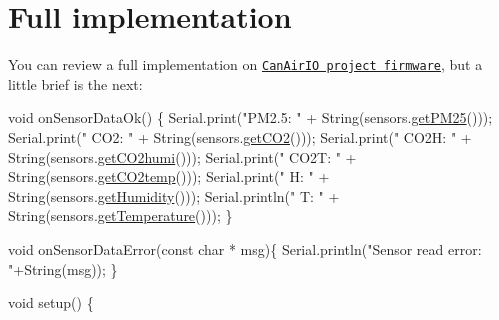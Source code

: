 \section*{Full implementation}

You can review a full implementation on \href{https://github.com/kike-canaries/canairio_firmware/blob/master/src/main.cpp}{\tt Can\+Air\+IO project firmware}, but a little brief is the next\+:


\begin{DoxyCode}
\textcolor{keywordtype}{void} onSensorDataOk() \{
    Serial.print(\textcolor{stringliteral}{"PM2.5: "} + String(sensors.\hyperlink{classSensors_adc3ad26b8a9be10b2100e3b023fdefc4}{getPM25}()));
    Serial.print(\textcolor{stringliteral}{" CO2: "}  + String(sensors.\hyperlink{classSensors_ad953d4564cc20d8134cccd962435dd81}{getCO2}()));
    Serial.print(\textcolor{stringliteral}{" CO2H: "} + String(sensors.\hyperlink{classSensors_a7fa1fe8f4f3469bce9311be880c243df}{getCO2humi}()));
    Serial.print(\textcolor{stringliteral}{" CO2T: "} + String(sensors.\hyperlink{classSensors_a7afb5c201c4e1933c96719e632181f71}{getCO2temp}()));
    Serial.print(\textcolor{stringliteral}{" H: "}    + String(sensors.\hyperlink{classSensors_a255bf73cd4afaf6c656dbbcabb1a8bb1}{getHumidity}()));
    Serial.println(\textcolor{stringliteral}{" T: "}  + String(sensors.\hyperlink{classSensors_ac4c22766994b94a2a28158ed72dc4a0c}{getTemperature}()));
\}

\textcolor{keywordtype}{void} onSensorDataError(\textcolor{keyword}{const} \textcolor{keywordtype}{char} * msg)\{
    Serial.println(\textcolor{stringliteral}{"Sensor read error: "}+String(msg));
\}

\textcolor{keywordtype}{void} setup() \{


\end{DoxyCode}
